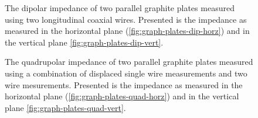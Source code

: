 \documentclass[review, number, sort&compress]{elsarticle}
\begin{document}
\begin{figure}
\caption{The dipolar impedance of two parallel graphite plates measured using two longitudinal coaxial wires. Presented is the impedance as measured in the horizontal plane (\ref{fig:graph-plates-dip-horz}) and in the vertical plane \ref{fig:graph-plates-dip-vert}.}
\label{fig:graph-plates-dipolar}
\end{figure}

\begin{figure}
\caption{The quadrupolar impedance of two parallel graphite plates measured using a combination of displaced single wire measurements and two wire mesurements. Presented is the impedance as measured in the horizontal plane (\ref{fig:graph-plates-quad-horz}) and in the vertical plane \ref{fig:graph-plates-quad-vert}.}
\label{fig:graph-plates-quadrupolar}
\end{figure}
\end{document}
